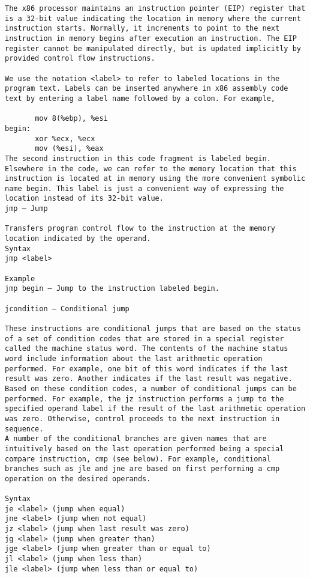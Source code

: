 \documentclass[10pt]{article}
\begin{document}
{\begin{multicols*}{5}
\begin{lstlisting}[breaklines=true,columns=fullflexible]
The x86 processor maintains an instruction pointer (EIP) register that is a 32-bit value indicating the location in memory where the current instruction starts. Normally, it increments to point to the next instruction in memory begins after execution an instruction. The EIP register cannot be manipulated directly, but is updated implicitly by provided control flow instructions.

We use the notation <label> to refer to labeled locations in the program text. Labels can be inserted anywhere in x86 assembly code text by entering a label name followed by a colon. For example,

       mov 8(%ebp), %esi
begin:
       xor %ecx, %ecx
       mov (%esi), %eax
The second instruction in this code fragment is labeled begin. Elsewhere in the code, we can refer to the memory location that this instruction is located at in memory using the more convenient symbolic name begin. This label is just a convenient way of expressing the location instead of its 32-bit value.
jmp — Jump

Transfers program control flow to the instruction at the memory location indicated by the operand.
Syntax
jmp <label>

Example
jmp begin — Jump to the instruction labeled begin.

jcondition — Conditional jump

These instructions are conditional jumps that are based on the status of a set of condition codes that are stored in a special register called the machine status word. The contents of the machine status word include information about the last arithmetic operation performed. For example, one bit of this word indicates if the last result was zero. Another indicates if the last result was negative. Based on these condition codes, a number of conditional jumps can be performed. For example, the jz instruction performs a jump to the specified operand label if the result of the last arithmetic operation was zero. Otherwise, control proceeds to the next instruction in sequence.
A number of the conditional branches are given names that are intuitively based on the last operation performed being a special compare instruction, cmp (see below). For example, conditional branches such as jle and jne are based on first performing a cmp operation on the desired operands.

Syntax
je <label> (jump when equal)
jne <label> (jump when not equal)
jz <label> (jump when last result was zero)
jg <label> (jump when greater than)
jge <label> (jump when greater than or equal to)
jl <label> (jump when less than)
jle <label> (jump when less than or equal to)


\end{lstlisting}
\end{multicols*}}
\end{document}
